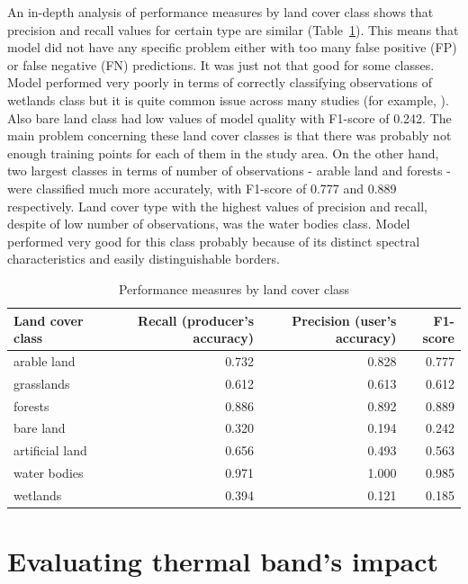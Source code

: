 \documentclass{amuthesis}
\begin{document}
An in-depth analysis of performance measures by land cover class shows
that precision and recall values for certain type are similar
(Table~\ref{tbl-tabela5}). This means that model did not have any
specific problem either with too many false positive (FP) or false
negative (FN) predictions. It was just not that good for some classes.
Model performed very poorly in terms of correctly classifying
observations of wetlands class but it is quite common issue across many
studies (for example, \textcite{malinowski_automated_2020}). Also bare
land class had low values of model quality with F1-score of 0.242. The
main problem concerning these land cover classes is that there was
probably not enough training points for each of them in the study area.
On the other hand, two largest classes in terms of number of
observations - arable land and forests - were classified much more
accurately, with F1-score of 0.777 and 0.889 respectively. Land cover
type with the highest values of precision and recall, despite of low
number of observations, was the water bodies class. Model performed very
good for this class probably because of its distinct spectral
characteristics and easily distinguishable borders.

\hypertarget{tbl-tabela5}{}
\begin{table}
\caption{\label{tbl-tabela5}Performance measures by land cover class }\tabularnewline

\centering
\begin{tabular}{|>{}l|>{}r|>{}r|>{}r|}
\toprule
\textbf{Land cover class} & \textbf{Recall (producer's accuracy)} & \textbf{Precision (user's accuracy)} & \textbf{F1-score}\\
\midrule
arable land & 0.732 & 0.828 & 0.777\\
\hline
grasslands & 0.612 & 0.613 & 0.612\\
\hline
forests & 0.886 & 0.892 & 0.889\\
\hline
bare land & 0.320 & 0.194 & 0.242\\
\hline
artificial land & 0.656 & 0.493 & 0.563\\
\hline
water bodies & 0.971 & 1.000 & 0.985\\
\hline
wetlands & 0.394 & 0.121 & 0.185\\
\bottomrule
\end{tabular}
\end{table}


\hypertarget{sec-results-therm}{%
\chapter{Evaluating thermal band's impact}\label{sec-results-therm}}
\end{document}
